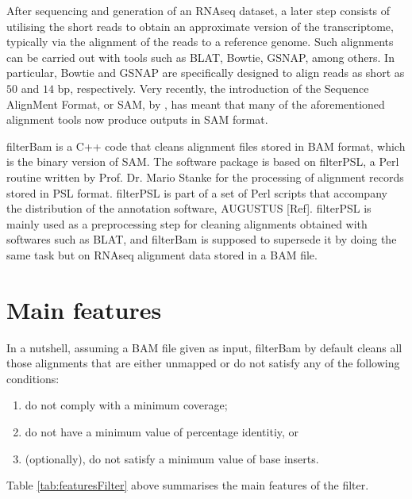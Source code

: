 \documentclass[11pt]{article}
\begin{document}
{After sequencing and generation of an RNAseq dataset, a later step consists of utilising the short 
reads to obtain an approximate 
version of the transcriptome, typically via the alignment of the reads to a reference genome. 
Such alignments can be carried out with tools such as BLAT, Bowtie, GSNAP, among others. In particular, 
Bowtie and GSNAP are specifically designed to align reads as short as $50$ and $14$ bp, respectively. 
Very recently, the introduction of the Sequence AlignMent Format, or SAM, by \citet{heng09:SAM}, has meant 
that many of the aforementioned alignment tools now produce outputs in SAM format. 

filterBam is a C++ code that cleans alignment files stored in BAM format, which is the binary version of 
SAM. The software package is based on filterPSL, a Perl routine written by Prof. Dr. Mario Stanke for the processing of 
alignment records stored in PSL format. filterPSL is part of a set of Perl scripts that accompany the 
distribution of the annotation software, AUGUSTUS [Ref]. filterPSL is mainly used as a preprocessing step 
for cleaning alignments obtained with softwares such as BLAT, and filterBam is supposed to supersede 
it by doing the same task but on RNAseq alignment data stored in a BAM file. 

\section{Main features}

In a nutshell, assuming a BAM file given as input, filterBam by default cleans all those alignments that are either unmapped or do not satisfy any of the following conditions:  
\begin{enumerate}
	\item	do not comply with a minimum coverage;
	\item	do not have a minimum value of percentage identitiy, or 
	\item	(optionally), do not satisfy a minimum value of base inserts. 
\end{enumerate} 
Table \ref{tab:featuresFilter} above summarises the main features of the filter. 

}
\end{document}

